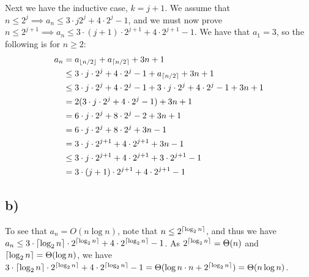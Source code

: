 \documentclass[a4paper]{article}
\begin{document}
Next we have the inductive case, \(k=j+1\).
We assume that \(n \leq 2^j \implies a_n \leq 3 \cdot j2^j + 4 \cdot 2^j - 1\), and we must now prove \(n \leq 2^{j+1} \implies a_n \leq 3 \cdot (j+1) \cdot 2^{j+1} + 4 \cdot 2^{j+1} - 1\). We have that \(a_1 = 3\), so the following is for \(n \geq 2\):
\[
\begin{aligned}
  a_n & = a_{\floor*{n/2}} + a_{\ceil*{n/2}} + 3n + 1 \\
  & \leq 3 \cdot j \cdot 2^j + 4 \cdot 2^j - 1 + a_{\ceil*{n/2}} + 3n + 1 \\
  & \leq 3 \cdot j \cdot 2^j + 4 \cdot 2^j - 1 + 3 \cdot j \cdot 2^j + 4 \cdot 2^j - 1 + 3n + 1 \\
  & = 2(3 \cdot j \cdot 2^j + 4 \cdot 2^j - 1) + 3n + 1 \\
  & = 6 \cdot j \cdot 2^j + 8 \cdot 2^j - 2 + 3n + 1 \\
  & = 6 \cdot j \cdot 2^j + 8 \cdot 2^j + 3n - 1 \\
  & = 3 \cdot j \cdot 2^{j+1} + 4 \cdot 2^{j+1} + 3n - 1 \\
  & \leq 3 \cdot j \cdot 2^{j+1} + 4 \cdot 2^{j+1} + 3 \cdot 2^{j+1} - 1 \\
  & = 3 \cdot (j+1) \cdot 2^{j+1} + 4 \cdot 2^{j+1} - 1
\end{aligned}
\]

\subsection*{b)}

To see that \(a_n = O(n \log n)\), note that \(n \le 2^{\ceil*{\log_2 n}}\), and thus we have \(a_n \leq 3 \cdot \ceil*{\log_2 n} \cdot 2^{\ceil*{\log_2 n}} + 4 \cdot 2^{\ceil*{\log_2 n}} - 1\). As \(2^{\ceil*{\log_2 n}} = \Theta(n)\) and \(\ceil*{\log_2 n} = \Theta(\log n)\), we have \(3 \cdot \ceil*{\log_2 n} \cdot 2^{\ceil*{\log_2 n}} + 4 \cdot 2^{\ceil*{\log_2 n}} - 1 = \Theta(\log n \cdot n + 2^{\ceil*{\log_2 n}}) = \Theta(n \log n)\).
\end{document}
